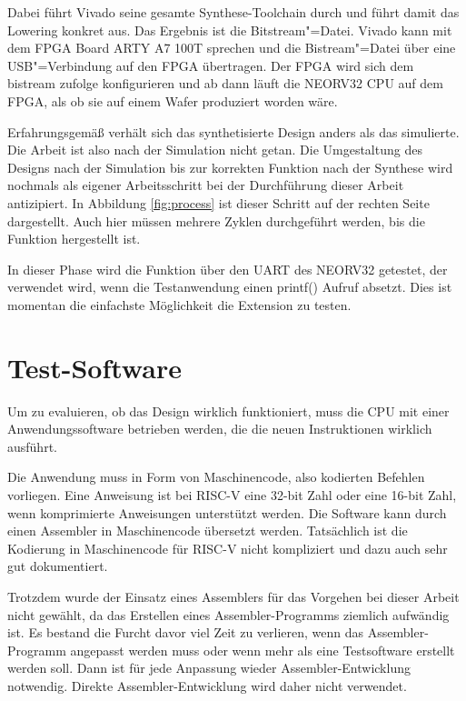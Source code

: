 Dabei führt Vivado seine gesamte Synthese-Toolchain durch und führt damit das Lowering konkret aus. Das Ergebnis ist die Bitstream"=Datei. Vivado kann mit dem FPGA Board ARTY A7 100T sprechen und die Bistream"=Datei über eine USB"=Verbindung auf den FPGA übertragen. Der FPGA wird sich dem bistream zufolge konfigurieren und ab dann läuft die NEORV32 CPU auf dem FPGA, als ob sie auf einem Wafer produziert worden wäre.


Erfahrungsgemäß verhält sich das synthetisierte Design anders als das simulierte. Die Arbeit ist also nach der Simulation nicht getan. Die Umgestaltung des Designs nach der Simulation bis zur korrekten Funktion nach der Synthese wird nochmals als eigener Arbeitsschritt bei der Durchführung dieser Arbeit antizipiert. In Abbildung \ref{fig:process} ist dieser Schritt auf der rechten Seite dargestellt. Auch hier müssen mehrere Zyklen durchgeführt werden, bis die Funktion hergestellt ist.

In dieser Phase wird die Funktion über den UART des NEORV32 getestet, der verwendet wird, wenn die Testanwendung einen printf() Aufruf absetzt. Dies ist momentan die einfachste Möglichkeit die Extension zu testen.




\section{Test-Software} \label{sec:testsoftware}

Um zu evaluieren, ob das Design wirklich funktioniert, muss die CPU mit einer Anwendungssoftware betrieben werden, die die neuen Instruktionen wirklich ausführt.

Die Anwendung muss in Form von Maschinencode, also kodierten Befehlen vorliegen. Eine Anweisung ist bei RISC-V eine 32-bit Zahl oder eine 16-bit Zahl, wenn komprimierte Anweisungen unterstützt werden. Die Software kann durch einen Assembler in Maschinencode übersetzt werden. Tatsächlich ist die Kodierung in Maschinencode für RISC-V nicht kompliziert und dazu auch sehr gut dokumentiert.

Trotzdem wurde der Einsatz eines Assemblers für das Vorgehen bei dieser Arbeit nicht gewählt, da das Erstellen eines Assembler-Programms ziemlich aufwändig ist. Es bestand die Furcht davor viel Zeit zu verlieren, wenn das Assembler-Programm angepasst werden muss oder wenn mehr als eine Testsoftware erstellt werden soll. Dann ist für jede Anpassung wieder Assembler-Entwicklung notwendig. Direkte Assembler-Entwicklung wird daher nicht verwendet.


